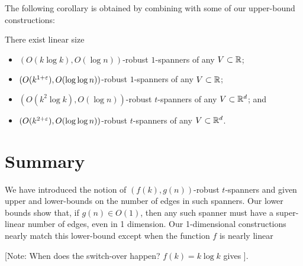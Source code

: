 \documentclass{patmorin}
\begin{document}
The following corollary is obtained by combining 
with some of our upper-bound constructions:
\begin{cor}
There exist linear size
\begin{itemize}
  \item $(O(k\log k),O(\log n))$-robust $1$-spanners of any
$V\subset \mathbb{R}$;
  \item $(O(k^{1+\varepsilon}),O(\log\log n))$-robust $1$-spanners of any
$V\subset \mathbb{R}$;
  \item $(O(k^2\log k), O(\log n))$-robust $t$-spanners of any
$V\subset \mathbb{R}^d$; and
  \item $(O(k^{2+\varepsilon}), O(\log\log n))$-robust $t$-spanners of any
$V\subset \mathbb{R}^d$.
\end{itemize}
\end{cor}

\section{Summary}

We have introduced the notion of $(f(k),g(n))$-robust $t$-spanners and
given upper and lower-bounds on the number of edges in such spanners.
Our lower bounds show that, if $g(n)\in O(1)$, then any such spanner
must have a super-linear number of edges, even in 1 dimension.  Our
1-dimensional constructions nearly match this lower-bound except when the
function $f$ is nearly linear 

[Note: When does the switch-over happen?  $f(k)=k\log k$ gives ].
\end{document}
